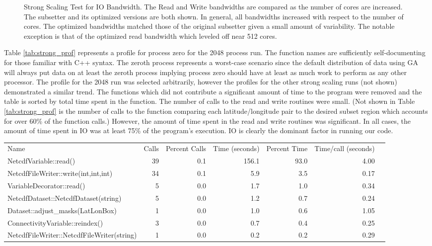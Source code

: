 \begin{figure}[!t]
\center
\resizebox{3.5in}{!}{

}
\caption{Strong Scaling Test for IO Bandwidth.  The Read and Write bandwidths
are compared as the number of cores are increased.  The subsetter and its
optimized versions are both shown.  In general, all bandwidths increased with
respect to the number of cores.  The optimized bandwidths matched those of the
original subsetter given a small amount of variability.  The notable exception
is that of the optimized read bandwidth which leveled off near 512 cores.}
\label{fig:strong_io}
\end{figure}

Table \ref{tab:strong_prof} represents a profile for process zero for the 2048
process run.  The function names are sufficiently self-documenting for those
familiar with C++ syntax.  The zeroth process represents a worst-case scenario
since the default distribution of data using GA will always put data on at
least the zeroth process implying process zero should have at least as much
work to perform as any other processor.  The profile for the 2048 run was
selected arbitrarily, however the profiles for the other strong scaling runs
(not shown) demonstrated a similar trend.  The functions which did not
contribute a significant amount of time to the program were removed and the
table is sorted by total time spent in the function.  The number of calls to
the read and write routines were small.  (Not shown in Table
\ref{tab:strong_prof} is the number of calls to the function comparing each
latitude/longitude pair to the desired subset region which accounts for over
60\% of the function calls.)  However, the amount of time spent in the read
and write routines was significant.  In all cases, the amount of time spent in
IO was at least 75\% of the program's execution.  IO is clearly the dominant
factor in running our code.

\begin{table*}[!t]
\center
\caption{Partial Profile for Process 0 at 2048 Cores - MJO Region}
\label{tab:strong_prof}
\begin{tabular}{lrrrrrr}
Name&Calls&Percent Calls&Time (seconds)&Percent Time&Time/call (seconds)\\
NetcdfVariable::read()                    &39&0.1&156.1&93.0&4.00\\
NetcdfFileWriter::write(int,int,int)      &34&0.1&  5.9& 3.5&0.17\\
VariableDecorator::read()                 & 5&0.0&  1.7& 1.0&0.34\\
NetcdfDataset::NetcdfDataset(string)      & 5&0.0&  1.2& 0.7&0.24\\
Dataset::adjust\_masks(LatLonBox)         & 1&0.0&  1.0& 0.6&1.05\\
ConnectivityVariable::reindex()           & 3&0.0&  0.7& 0.4&0.25\\
NetcdfFileWriter::NetcdfFileWriter(string)& 1&0.0&  0.2& 0.2&0.29\\
\end{tabular}
\end{table*}

